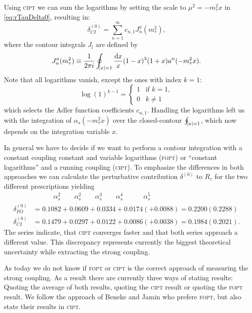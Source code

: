 \documentclass[../../index.tex]{subfiles}
\begin{document}
Using \textsc{cipt} we can sum the logarithms by setting the scale to \(\mu^2 =
-m_\tau^2 x\) in \cref{eq:rTauDelta0}, resulting in:
\begin{equation}
  \delta^{(0)}_{CI} = \sum_{n=1}^\infty c_{n,1} J_n^a(m_\tau^2),
\end{equation}
where the contour integrals $J_l$ are defined by
\begin{equation}
  J_n^a(m_\tau^2) \equiv \frac{1}{2 \pi i} \oint_{\abs{x}=1} \frac{\dif x}{x} (1-x)^3(1+x) a^n(-m_\tau^2 x).
\end{equation}
Note that all logarithms vanish, except the ones with index \(k=1\):
\begin{equation}
  \log(1)^{k-1} =  \begin{cases} \mbox{1} & \mbox{if } k=1, \\ \mbox{0} & k\neq 1 \end{cases}
\end{equation}
which selects the Adler function coefficients \(c_{n,1}\). Handling the
logarithms left us with the integration of \(\alpha_s(- m_\tau^2 x)\) over the
closed-contour \(\oint_{\abs{x}=1}\), which now depends on the integration
variable \(x\).

In general we have to decide if we want to perform a contour integration with a
constant coupling constant and variable logarithms (\textsc{fopt}) or ``constant
logarithms'' and a running coupling (\textsc{cipt}). To emphasize the
differences in both approaches we can calculate the perturbative contribution
\(\delta^{(0)}\) to \(R_\tau\) for the two different prescriptions yielding
\cite{Beneke2008}
\begin{align}
  & \quad\qquad \alpha_s^2 \qquad \alpha_s^2 \qquad \alpha_s^3 \qquad \alpha_s^4 \quad\qquad \alpha_s^5 \nonumber\\
  \delta_{FO}^{(0)} &= 0.1082 + 0.0609 + 0.0334 + 0.0174 (+ 0.0088) = 0.2200 (0.2288) \\
  \delta_{CI}^{(0)} &= 0.1479 + 0.0297 + 0.0122 + 0.0086 (+ 0.0038) = 0.1984 (0.2021).
\end{align}
The series indicate, that \textsc{cipt} converges faster and that both series
approach a different value. This discrepancy represents currently the biggest
theoretical uncertainty while extracting the strong coupling.

As today we do not know if \textsc{fopt} or \textsc{cipt} is the correct
approach of measuring the strong coupling. As a result there are currently three
ways of stating results: Quoting the average of both results, quoting the
\textsc{cipt} result or quoting the \textsc{fopt} result. We follow the approach
of Beneke and Jamin \cite{Beneke2008} who prefere \textsc{fopt}, but also state
their results in \textsc{cipt}.
\end{document}
